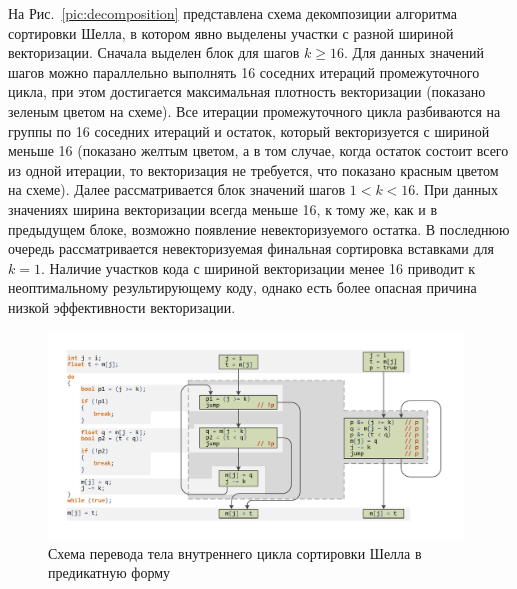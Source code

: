 \documentclass[utf8]{psta}
\begin{document}
На Рис.~\ref{pic:decomposition} представлена схема декомпозиции алгоритма сортировки Шелла, в котором явно выделены участки с разной шириной векторизации. 
Сначала выделен блок для шагов $k \ge 16$. 
Для данных значений шагов можно параллельно выполнять 16 соседних итераций промежуточного цикла, при этом достигается максимальная плотность векторизации (показано зеленым цветом на схеме). 
Все итерации промежуточного цикла разбиваются на группы по 16 соседних итераций и остаток, который векторизуется с шириной меньше 16 (показано желтым цветом, а в том случае, когда остаток состоит всего из одной итерации, то векторизация не требуется, что показано красным цветом на схеме). Далее рассматривается блок значений шагов $1 < k < 16$. 
При данных значениях ширина векторизации всегда меньше 16, к тому же, как и в предыдущем блоке, возможно появление невекторизуемого остатка. 
В последнюю очередь рассматривается невекторизуемая финальная сортировка вставками для $k = 1$. 
Наличие участков кода с шириной векторизации менее 16 приводит к неоптимальному результирующему коду, однако есть более опасная причина низкой эффективности векторизации.

\begin{figure}
\includegraphics[width=11cm]{pics/pic_shell_cfg}
\caption{Схема перевода тела внутреннего цикла сортировки Шелла в предикатную форму}
\label{pic:shell_cfg}
\end{figure}
\end{document}

